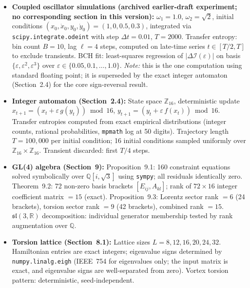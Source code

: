 \documentclass[12pt,a4paper]{article}
\theoremstyle{plain}
\theoremstyle{definition}
\theoremstyle{remark}
\newcommand{\DI}{\Delta\mathcal{I}}
\newcommand{\eps}{\varepsilon}
\begin{document}
\begin{itemize}[noitemsep]
  \item \textbf{Coupled oscillator simulations (archived earlier-draft experiment; no corresponding section in this version):}
    $\omega_1 = 1.0$, $\omega_2 = \sqrt{2}$,
    initial conditions $(x_0, \dot{x}_0, y_0, \dot{y}_0) = (1, 0, 0.5, 0.3)$,
    integrated via \texttt{scipy.integrate.odeint} with step $\Delta t = 0.01$,
    $T = 2000$.  Transfer entropy: bin count $B = 10$, lag $\ell = 4$ steps,
    computed on late-time series $t \in [T/2, T]$ to exclude transients.
    BCH fit: least-squares regression of $|\DI(\eps)|$ on basis
    $\{\eps, \eps^2, \eps^3\}$ over $\eps \in \{0.05, 0.1, \ldots, 1.0\}$.
    \emph{Note:} this is the one computation using standard floating point;
    it is superseded by the exact integer automaton (Section~2.4) for the
    core sign-reversal result.

  \item \textbf{Integer automaton (Section~2.4):}
    State space $\mathbb{Z}_{16}$, deterministic update
    $x_{t+1} = (x_t + \eps\, g(y_t)) \bmod 16$,
    $y_{t+1} = (y_t + \eps\, f(x_t)) \bmod 16$.
    Transfer entropies computed from exact empirical distributions
    (integer counts, rational probabilities, \texttt{mpmath} log at 50 digits).
    Trajectory length $T = 100{,}000$ per initial condition;
    16 initial conditions sampled uniformly over $\mathbb{Z}_{16} \times \mathbb{Z}_{16}$.
    Transient discarded: first $T/4$ steps.

  \item \textbf{GL(4) algebra (Section~9):}
    Proposition~9.1: 160 constraint equations solved symbolically over
    $\mathbb{Q}[i,\sqrt{3}]$ using \texttt{sympy}; all residuals identically zero.
    Theorem~9.2: 72 non-zero basis brackets $[E_{ij}, A_{kl}]$; rank of
    $72 \times 16$ integer coefficient matrix $= 15$ (exact).
    Proposition~9.3: Lorentz sector rank $= 6$ (24 brackets),
    torsion sector rank $= 9$ (42 brackets), combined rank $= 15$.
    $\mathfrak{sl}(3,\mathbb{R})$ decomposition: individual generator membership
    tested by rank augmentation over $\mathbb{Q}$.

  \item \textbf{Torsion lattice (Section~8.1):}
    Lattice sizes $L = 8, 12, 16, 20, 24, 32$.
    Hamiltonian entries are exact integers; eigenvalue signs determined
    by \texttt{numpy.linalg.eigh} (IEEE~754 for eigenvalues only;
    the input matrix is exact, and eigenvalue signs are well-separated
    from zero).  Vortex torsion pattern: deterministic, seed-independent.


\end{itemize}
\end{document}
